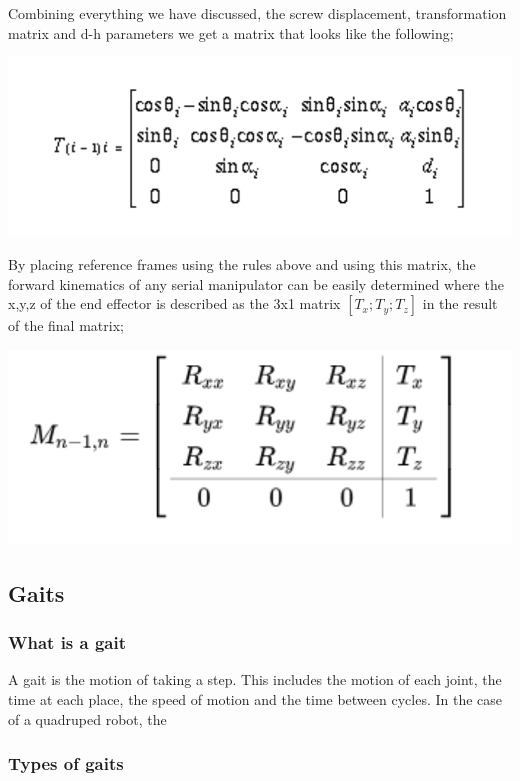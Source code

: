     Combining everything we have discussed, the screw displacement, transformation matrix and d-h parameters we get a matrix that looks like the following;
    \begin{center}
    \includegraphics[width=150mm]{Matrizx.PNG}
    \end{center}
    By placing reference frames using the rules above and using this matrix, the forward kinematics of any serial manipulator can be easily determined where the x,y,z of the end effector is described as the 3x1 matrix $[T_x; T_y; T_z]$ in the result of the final matrix; 
     \begin{center}
    \includegraphics[width=150mm]{Matrix2.PNG}
    \end{center}
    
\subsection{Gaits}
    \subsubsection{What is a gait}
    A gait is the motion of taking  a step. This includes the motion of each joint, the time at each place, the speed of motion and the time between cycles. In the case of a quadruped robot, the 
    
    \subsubsection{Types of gaits}
    




